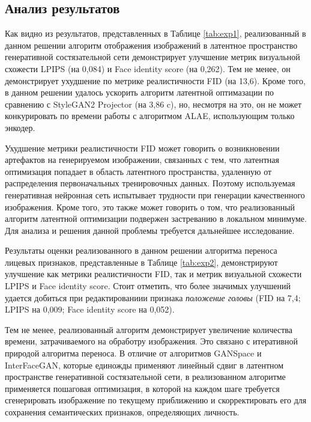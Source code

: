 \subsection{Анализ результатов}

Как видно из результатов, представленных в Таблице \ref{tab:exp1}, реализованный в данном решении алгоритм отображения изображений в латентное пространство генеративной состязательной сети демонстрирует улучшение метрик визуальной схожести LPIPS (на 0,084) и Face identity score (на 0,262).
Тем не менее, он демонстрирует ухудшение по метрике реалистичности FID (на 13,6).
Кроме того, в данном решении удалось ускорить алгоритм латентной оптимазации по сравнению с StyleGAN2 Projector (на 3,86 c), но, несмотря на это, он не может конкурировать по времени работы с алгоритмом ALAE, использующим только энкодер.

Ухудшение метрики реалистичности FID может говорить о возникновении артефактов на генерируемом изображении, связанных с тем, что латентная оптимизация попадает в область латентного пространства, удаленную от распределения первоначальных тренировочных данных.
Поэтому используемая генеративная нейронная сеть испытывает трудности при генерации качественного изображения.
Кроме того, это также может говорить о том, что реализованный алгоритм латентной оптимизации подвержен застреванию в локальном минимуме. Для анализа и решения данной проблемы требуется дальнейшее исследование.

Результаты оценки реализованного в данном решении алгоритма переноса лицевых признаков, представленные в Таблице \ref{tab:exp2}, демонстрируют улучшение как метрики реалистичности FID, так и метрик визуальной схожести LPIPS и Face identity score.
Стоит отметить, что более значимых улучшений удается добиться при редактированиии признака \emph{положение головы} (FID на 7,4; LPIPS на 0,009; Face identity score на 0,052).

Тем не менее, реализованный алгоритм демонстрирует увеличение количества времени, затрачиваемого на обработру изображения.
Это связано с итеративной природой алгоритма переноса.
В отличие от алгоритмов GANSpace и InterFaceGAN, которые единожды применяют линейный сдвиг в латентном пространстве генеративной состязательной сети, в реализованном алгоритме применяется пошаговая оптимизация, в которой на каждом шаге требуется сгенерировать изображение по текущему приближению и скорректировать его для сохранения семантических признаков, определяющих личность.